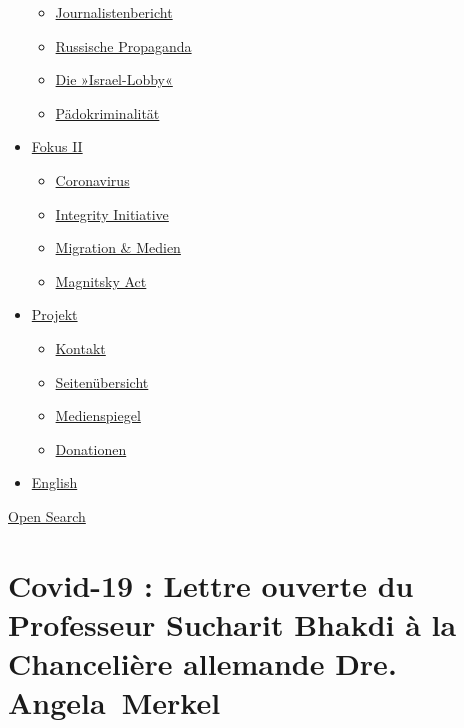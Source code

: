 \begin{itemize}
  \begin{itemize}
  \tightlist
  \item
    \href{https://swprs.org/bericht-eines-journalisten/}{Journalistenbericht}
  \item
    \href{https://swprs.org/russische-propaganda/}{Russische Propaganda}
  \item
    \href{https://swprs.org/die-israel-lobby-fakten-und-mythen/}{Die
    »Israel-Lobby«}
  \item
    \href{https://swprs.org/geopolitik-und-paedokriminalitaet/}{Pädokriminalität}
  \end{itemize}
\item
  \href{https://swprs.org/migration-und-medien/}{Fokus II}

  \begin{itemize}
  \tightlist
  \item
    \href{https://swprs.org/covid-19-hinweis-ii/}{Coronavirus}
  \item
    \href{https://swprs.org/die-integrity-initiative/}{Integrity
    Initiative}
  \item
    \href{https://swprs.org/migration-und-medien/}{Migration \& Medien}
  \item
    \href{https://swprs.org/der-fall-magnitsky/}{Magnitsky Act}
  \end{itemize}
\item
  \href{https://swprs.org/kontakt/}{Projekt}

  \begin{itemize}
  \tightlist
  \item
    \href{https://swprs.org/kontakt/}{Kontakt}
  \item
    \href{https://swprs.org/uebersicht/}{Seitenübersicht}
  \item
    \href{https://swprs.org/medienspiegel/}{Medienspiegel}
  \item
    \href{https://swprs.org/donationen/}{Donationen}
  \end{itemize}
\item
  \href{https://swprs.org/contact/}{English}
\end{itemize}

\protect\hyperlink{}{Open Search}

\hypertarget{covid-19--lettre-ouverte-du-professeur-sucharit-bhakdi-uxe0-la-chanceliuxe8re-allemande-dre-angela-merkel}{%
\section{Covid-19 : Lettre ouverte du Professeur Sucharit Bhakdi à la
Chancelière allemande Dre.
Angela~Merkel}\label{covid-19--lettre-ouverte-du-professeur-sucharit-bhakdi-uxe0-la-chanceliuxe8re-allemande-dre-angela-merkel}}

